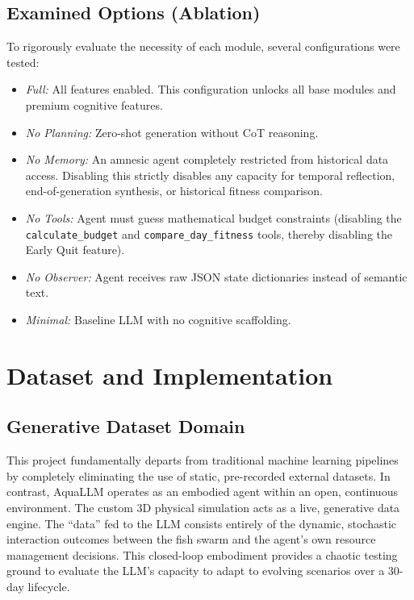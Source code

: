 \documentclass[conference]{IEEEtran}
\begin{document}
\subsection{Examined Options (Ablation)}
To rigorously evaluate the necessity of each module, several configurations were tested: 
\begin{itemize}
    \item \textit{Full:} All features enabled. This configuration unlocks all base modules and premium cognitive features.
    \item \textit{No Planning:} Zero-shot generation without CoT reasoning.
    \item \textit{No Memory:} An amnesic agent completely restricted from historical data access. Disabling this strictly disables any capacity for temporal reflection, end-of-generation synthesis, or historical fitness comparison.
    \item \textit{No Tools:} Agent must guess mathematical budget constraints (disabling the \texttt{calculate\_budget} and \texttt{compare\_day\_fitness} tools, thereby disabling the Early Quit feature).
    \item \textit{No Observer:} Agent receives raw JSON state dictionaries instead of semantic text.
    \item \textit{Minimal:} Baseline LLM with no cognitive scaffolding.
\end{itemize}

\section{Dataset and Implementation}

\subsection{Generative Dataset Domain}
This project fundamentally departs from traditional machine learning pipelines by completely eliminating the use of static, pre-recorded external datasets. In contrast, AquaLLM operates as an embodied agent within an open, continuous environment. The custom 3D physical simulation acts as a live, generative data engine. The ``data'' fed to the LLM consists entirely of the dynamic, stochastic interaction outcomes between the fish swarm and the agent's own resource management decisions. This closed-loop embodiment provides a chaotic testing ground to evaluate the LLM's capacity to adapt to evolving scenarios over a 30-day lifecycle.
\end{document}
